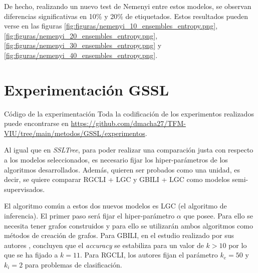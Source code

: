 
De hecho, realizando un nuevo test de Nemenyi entre estos modelos, se observan diferencias significativas en 10\% y 20\% de etiquetados. Estos resultados pueden verse en las figuras \ref{fig:figuras/nemenyi_10_ensembles_entropy.png}, \ref{fig:figuras/nemenyi_20_ensembles_entropy.png}, \ref{fig:figuras/nemenyi_30_ensembles_entropy.png} y \ref{fig:figuras/nemenyi_40_ensembles_entropy.png}.





\section{Experimentación GSSL}

\begin{mainbox}{Código de la experimentación}
    Toda la codificación de los experimentos realizados puede encontrarse en \url{https://github.com/dmacha27/TFM-VIU/tree/main/metodos/GSSL/experimentos}.
\end{mainbox}

Al igual que en \textit{SSLTree}, para poder realizar una comparación justa con respecto a los modelos seleccionados, es necesario fijar los hiper-parámetros de los algoritmos desarrollados. Además, quieren ser probados como una unidad, es decir, se quiere comparar RGCLI + LGC y GBILI + LGC como modelos semi-supervisados. 

El algoritmo común a estos dos nuevos modelos es LGC (el algoritmo de inferencia). El primer paso será fijar el hiper-parámetro $\alpha$ que posee. Para ello se necesita tener grafos construidos y para ello se utilizarán ambos algoritmos como métodos de creación de grafos. Para GBILI, en el estudio realizado por sus autores \cite{berton2014graph}, concluyen que el \textit{accuracy} se estabiliza para un valor de $k > 10$ por lo que se ha fijado a $k = 11$. Para RGCLI, los autores \cite{berton2017rgcli} fijan el parámetro $k_e = 50$ y $k_i = 2$ para problemas de clasificación. 

